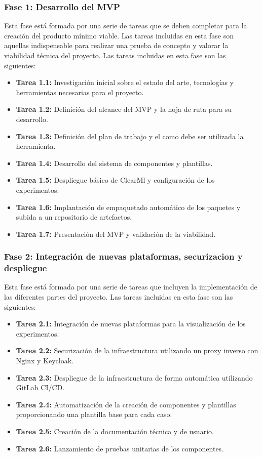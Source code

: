 \subsubsection{Fase 1: Desarrollo del MVP}
Esta fase está formada por una serie de tareas que se deben completar para
la creación del producto mínimo viable. Las tareas incluidas en esta fase son
aquellas indispensable para realizar una prueba de concepto y valorar la viabilidad
técnica del proyecto. Las tareas incluidas en esta fase son las siguientes:

\begin{itemize}
    \item \textbf{Tarea 1.1:} Investigación inicial sobre el estado del arte,
    tecnologías y herramientas necesarias para el proyecto.
    \item \textbf{Tarea 1.2:} Definición del alcance del MVP y la hoja de ruta
    para su desarrollo.
    \item \textbf{Tarea 1.3:} Definición del plan de trabajo y el como debe
    ser utilizada la herramienta.
    \item \textbf{Tarea 1.4:} Desarrollo del sistema de componentes y plantillas.
    \item \textbf{Tarea 1.5:} Despliegue básico de ClearMl y configuración de los experimentos.
    \item \textbf{Tarea 1.6:} Implantación de empaquetado automático de los
    paquetes y subida a un repositorio de artefactos.
    \item \textbf{Tarea 1.7:} Presentación del MVP y validación de la viabilidad.
\end{itemize}

\subsubsection{Fase 2: Integración de nuevas plataformas, securizacion y despliegue}
Esta fase está formada por una serie de tareas que incluyen la implementación
de las diferentes partes del proyecto. Las tareas incluidas en esta fase son
las siguientes:

\begin{itemize}
    \item \textbf{Tarea 2.1:} Integración de nuevas plataformas para la
    visualización de los experimentos.
    \item \textbf{Tarea 2.2:} Securización de la infraestructura utilizando
    un proxy inverso con Nginx y Keycloak.
    \item \textbf{Tarea 2.3:} Despliegue de la infraestructura de forma automática
    utilizando GitLab CI/CD.
    \item \textbf{Tarea 2.4:} Automatización de la creación de componentes y
    plantillas proporcionando una plantilla base para cada caso.
    \item \textbf{Tarea 2.5:} Creación de la documentación técnica y de usuario.
    \item \textbf{Tarea 2.6:} Lanzamiento de pruebas unitarias de los componentes.
\end{itemize}


